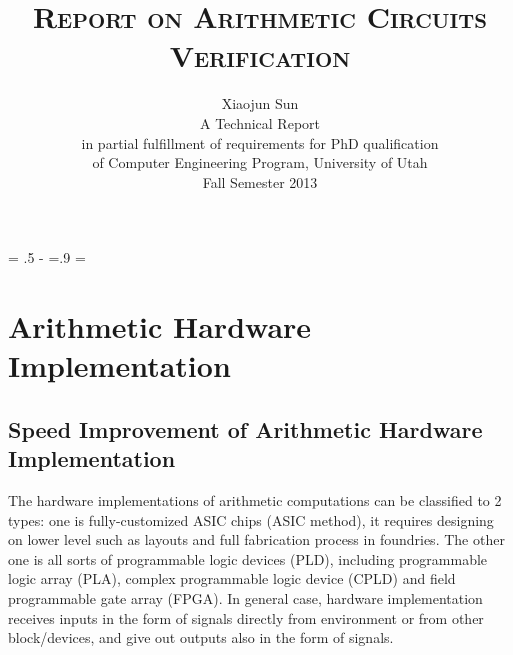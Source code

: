 \documentclass[11pt,twoside, onecolumn]{IEEEtran}
\newcommand{\ls}[1]
    {\dimen0=\fontdimen6\the\font
     \lineskip=#1\dimen0
     \advance\lineskip.5\fontdimen5\the\font
     \advance\lineskip-\dimen0
     \lineskiplimit=.9\lineskip
     \baselineskip=\lineskip
     \advance\baselineskip\dimen0
     \normallineskip\lineskip
     \normallineskiplimit\lineskiplimit
     \normalbaselineskip\baselineskip
     \ignorespaces
    }
\begin{document}

\ls{1.1}

\title{\large{\textsc{Report on Arithmetic Circuits Verification}}}
\author{Xiaojun Sun\\
A Technical Report\\
in partial fulfillment of requirements for PhD qualification\\
of Computer Engineering Program, University of Utah\\
Fall Semester 2013
}

%
 
\maketitle

\newcommand{\Fq}{{\mathbb{F}}_{q}}
\newcommand{\Fkk}{{\mathbb{F}}_{2^k}}
\newcommand{\Fkkx}[1][x]{\ensuremath{\mathbb{F}}_{2^k}[#1]\xspace}
\newcommand{\Grobner}{Gr\"{o}bner\xspace}
\newcommand{\B}{{\mathbb{B}}}
\newcommand{\Z}{{\mathbb{Z}}}
\newcommand{\F}{{\mathbb{F}}}
\newcommand{\G}{{\mathcal{G}}}
\newcommand{\R}{\mathbb{R}}

\newcommand{\debug}[1]{\textcolor{gray}{[ #1 ]}}



\section{Arithmetic Hardware Implementation}
\subsection{Speed Improvement of Arithmetic Hardware Implementation}
The hardware implementations of arithmetic computations can be classified to 2 types:
one is fully-customized ASIC chips (ASIC method), it requires designing on lower level such as 
layouts and full fabrication process in foundries. The other one is all sorts of programmable
logic devices (PLD), including programmable logic array (PLA), complex programmable logic device 
(CPLD) and field programmable gate array (FPGA). In general case, hardware implementation 
receives inputs in the form of signals directly from environment or from other block/devices,
and give out outputs also in the form of signals.
\end{document}
